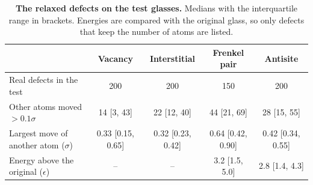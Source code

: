 \begin{table}[h]
\centering
\caption{\textbf{The relaxed defects on the test glasses.} Medians with the interquartile range in brackets. Energies are compared with the original glass, so only defects that keep the number of atoms are listed.}
\label{tab:physics}
\footnotesize
\begin{tabular}{@{}lcccc@{}}
\toprule
 & Vacancy & Interstitial & Frenkel pair & Antisite \\
\midrule
Real defects in the test & 200 & 200 & 150 & 200 \\
Other atoms moved $>0.1\sigma$ & 14 [3, 43] & 22 [12, 40] & 44 [21, 69] & 28 [15, 55] \\
Largest move of another atom ($\sigma$) & 0.33 [0.15, 0.65] & 0.32 [0.23, 0.42] & 0.64 [0.42, 0.90] & 0.42 [0.34, 0.55] \\
Energy above the original ($\epsilon$) & -- & -- & 3.2 [1.5, 5.0] & 2.8 [1.4, 4.3] \\
\bottomrule
\end{tabular}
\end{table}
